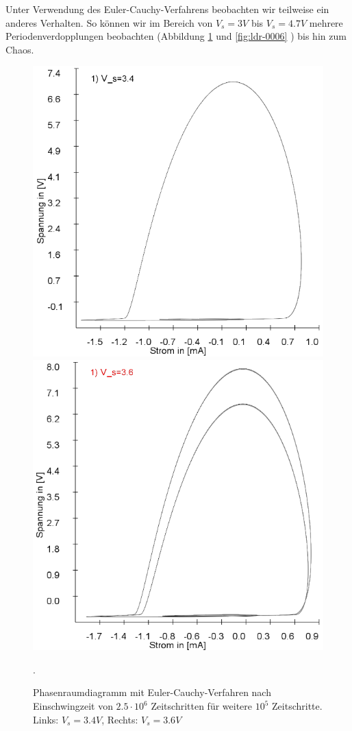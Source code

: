 \documentclass{scrartcl}
\begin{document}
Unter Verwendung des Euler-Cauchy-Verfahrens beobachten wir teilweise ein anderes Verhalten. So können wir im Bereich von $V_s=3V$ bis $V_s=4.7V$ mehrere Periodenverdopplungen beobachten (Abbildung \ref{fig:ldr-0005} und \ref{fig:ldr-0006} ) bis hin zum Chaos.
\begin{figure}[!htbp]
\includegraphics[scale=0.42]{schwing-euler-nach2500k-weitere100k-3,4V}
\includegraphics[scale=0.42]{schwing-euler-nach2500k-weitere100k-3,6V}
\caption{Phasenraumdiagramm mit Euler-Cauchy-Verfahren nach Einschwingzeit von $2.5\cdot10^6$ Zeitschritten für weitere $10^5$ Zeitschritte. Links: $V_s=3.4V$, Rechts: $V_s=3.6V$}. 
\label{fig:ldr-0005}
\end{figure}
\end{document}

